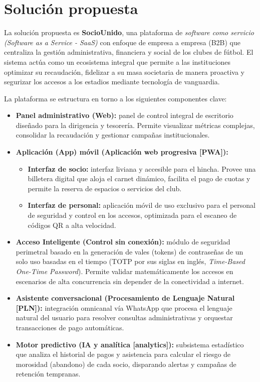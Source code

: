 \section{Solución propuesta}

La solución propuesta es \textbf{SocioUnido}, una plataforma de \textit{software como servicio (Software as a Service - SaaS)} con enfoque de empresa a empresa (B2B) que centraliza la gestión administrativa, financiera y social de los clubes de fútbol. El sistema actúa como un ecosistema integral que permite a las instituciones optimizar su recaudación, fidelizar a su masa societaria de manera proactiva y segurizar los accesos a los estadios mediante tecnología de vanguardia.

La plataforma se estructura en torno a los siguientes componentes clave:

\begin{itemize}
    \item \textbf{Panel administrativo (Web):} panel de control integral de escritorio diseñado para la dirigencia y tesorería. Permite visualizar métricas complejas, consolidar la recaudación y gestionar campañas institucionales.
    \item \textbf{Aplicación (App) móvil (Aplicación web progresiva [PWA]):}
    \begin{itemize}
        \item \textbf{Interfaz de socio:} interfaz liviana y accesible para el hincha. Provee una billetera digital que aloja el carnet dinámico, facilita el pago de cuotas y permite la reserva de espacios o servicios del club.
        \item \textbf{Interfaz de personal:} aplicación móvil de uso exclusivo para el personal de seguridad y control en los accesos, optimizada para el escaneo de códigos QR a alta velocidad.
    \end{itemize}
    \item \textbf{Acceso Inteligente (Control sin conexión):} módulo de seguridad perimetral basado en la generación de vales (tokens) de contraseñas de un solo uso basadas en el tiempo (TOTP por sus siglas en inglés, \textit{Time-Based One-Time Password}). Permite validar matemáticamente los accesos en escenarios de alta concurrencia sin depender de la conectividad a internet.
    \item \textbf{Asistente conversacional (Procesamiento de Lenguaje Natural [PLN]):} integración omnicanal vía WhatsApp que procesa el lenguaje natural del usuario para resolver consultas administrativas y orquestar transacciones de pago automáticas.
    \item \textbf{Motor predictivo (IA y analítica [analytics]):} subsistema estadístico que analiza el historial de pagos y asistencia para calcular el riesgo de morosidad (abandono) de cada socio, disparando alertas y campañas de retención tempranas.
\end{itemize}

